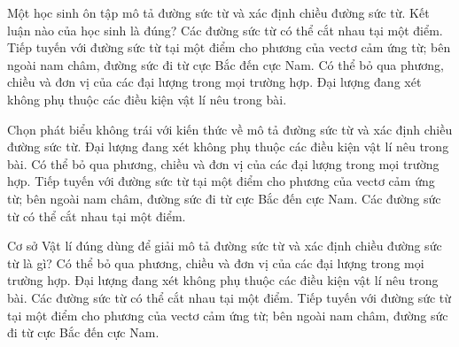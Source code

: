 \begin{ex}
Một học sinh ôn tập mô tả đường sức từ và xác định chiều đường sức từ. Kết luận nào của học sinh là đúng?
\choice
{Các đường sức từ có thể cắt nhau tại một điểm.}
{\True Tiếp tuyến với đường sức từ tại một điểm cho phương của vectơ cảm ứng từ; bên ngoài nam châm, đường sức đi từ cực Bắc đến cực Nam.}
{Có thể bỏ qua phương, chiều và đơn vị của các đại lượng trong mọi trường hợp.}
{Đại lượng đang xét không phụ thuộc các điều kiện vật lí nêu trong bài.}
\end{ex}

\begin{ex}
Chọn phát biểu không trái với kiến thức về mô tả đường sức từ và xác định chiều đường sức từ.
\choice
{Đại lượng đang xét không phụ thuộc các điều kiện vật lí nêu trong bài.}
{Có thể bỏ qua phương, chiều và đơn vị của các đại lượng trong mọi trường hợp.}
{\True Tiếp tuyến với đường sức từ tại một điểm cho phương của vectơ cảm ứng từ; bên ngoài nam châm, đường sức đi từ cực Bắc đến cực Nam.}
{Các đường sức từ có thể cắt nhau tại một điểm.}
\end{ex}

\begin{ex}
Cơ sở Vật lí đúng dùng để giải mô tả đường sức từ và xác định chiều đường sức từ là gì?
\choice
{Có thể bỏ qua phương, chiều và đơn vị của các đại lượng trong mọi trường hợp.}
{Đại lượng đang xét không phụ thuộc các điều kiện vật lí nêu trong bài.}
{Các đường sức từ có thể cắt nhau tại một điểm.}
{\True Tiếp tuyến với đường sức từ tại một điểm cho phương của vectơ cảm ứng từ; bên ngoài nam châm, đường sức đi từ cực Bắc đến cực Nam.}
\end{ex}

